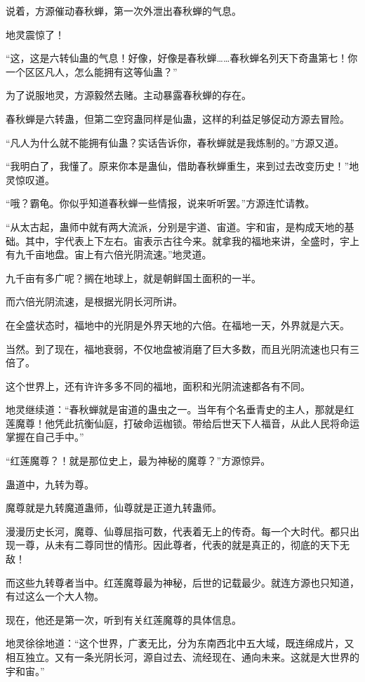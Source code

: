 \begin{this_body}
说着，方源催动春秋蝉，第一次外泄出春秋蝉的气息。

地灵震惊了！

“这，这是六转仙蛊的气息！好像，好像是春秋蝉……春秋蝉名列天下奇蛊第七！你一个区区凡人，怎么能拥有这等仙蛊？”

为了说服地灵，方源毅然去赌。主动暴露春秋蝉的存在。

春秋蝉是六转蛊，但第二空窍蛊同样是仙蛊，这样的利益足够促动方源去冒险。

“凡人为什么就不能拥有仙蛊？实话告诉你，春秋蝉就是我炼制的。”方源又道。

“我明白了，我懂了。原来你本是蛊仙，借助春秋蝉重生，来到过去改变历史！”地灵惊叹道。

“哦？霸龟。你似乎知道春秋蝉一些情报，说来听听罢。”方源连忙请教。

“从太古起，蛊师中就有两大流派，分别是宇道、宙道。宇和宙，是构成天地的基础。其中，宇代表上下左右。宙表示古往今来。就拿我的福地来讲，全盛时，宇上有九千亩地盘。宙上有六倍光阴流速。”地灵道。

九千亩有多广呢？搁在地球上，就是朝鲜国土面积的一半。

而六倍光阴流速，是根据光阴长河所讲。

在全盛状态时，福地中的光阴是外界天地的六倍。在福地一天，外界就是六天。

当然。到了现在，福地衰弱，不仅地盘被消磨了巨大多数，而且光阴流速也只有三倍了。

这个世界上，还有许许多多不同的福地，面积和光阴流速都各有不同。

地灵继续道：“春秋蝉就是宙道的蛊虫之一。当年有个名垂青史的主人，那就是红莲魔尊！他凭此抗衡仙庭，打破命运枷锁。带给后世天下人福音，从此人民将命运掌握在自己手中。”

“红莲魔尊？！就是那位史上，最为神秘的魔尊？”方源惊异。

蛊道中，九转为尊。

魔尊就是九转魔道蛊师，仙尊就是正道九转蛊师。

漫漫历史长河，魔尊、仙尊屈指可数，代表着无上的传奇。每一个大时代。都只出现一尊，从未有二尊同世的情形。因此尊者，代表的就是真正的，彻底的天下无敌！

而这些九转尊者当中。红莲魔尊最为神秘，后世的记载最少。就连方源也只知道，有过这么一个大人物。

现在，他还是第一次，听到有关红莲魔尊的具体信息。

地灵徐徐地道：“这个世界，广袤无比，分为东南西北中五大域，既连绵成片，又相互独立。又有一条光阴长河，源自过去、流经现在、通向未来。这就是大世界的宇和宙。”


\end{this_body}
